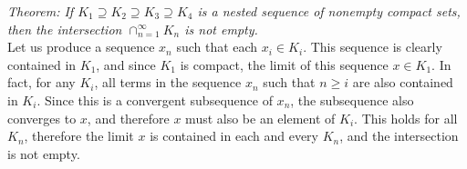 \documentclass[12pt, letterpaper, twoside]{article}
\begin{document}
\textit{Theorem: If $K_1 \supseteq K_2 \supseteq K_3 \supseteq K_4$ is a nested sequence of nonempty compact sets, then the intersection $\cap_{n=1}^\infty K_n$ is not empty. } \\

Let us produce a sequence $x_n$ such that each $x_i \in K_i$. This sequence is clearly contained in $K_1$, and since $K_1$ is compact, the limit of this sequence $x \in K_1$. In fact, for any $K_i$, all terms in the sequence $x_n$ such that $n \geq i$ are also contained in $K_i$. Since this is a convergent subsequence of $x_n$, the subsequence also converges to $x$, and therefore $x$ must also be an element of $K_i$. This holds for all $K_n$, therefore the limit $x$ is contained in each and every $K_n$, and the intersection is not empty. 
\end{document}
